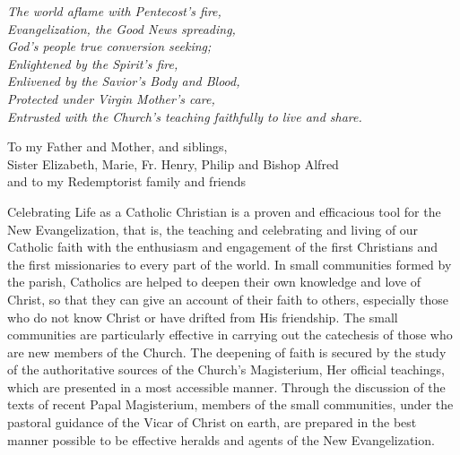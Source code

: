 \documentclass[oneside]{book}
\begin{document}

\vspace*{\fill}
\begin{center}

\emph{The world aflame with Pentecost's fire, \\
Evangelization, the Good News spreading, \\
God's people true conversion seeking; \\
Enlightened by the Spirit's fire, \\
Enlivened by the Savior's Body and Blood, \\
Protected under Virgin Mother's care, \\
Entrusted with the Church's teaching faithfully to live and share.}

\end{center}
\vspace*{\fill}
\pagebreak


\vspace*{\fill}
\begin{center}

To my Father and Mother, and siblings, \\
Sister Elizabeth, Marie, Fr. Henry, Philip and Bishop Alfred \\
and to my Redemptorist family and friends

\end{center}
\vspace*{\fill}
\pagebreak


\maketitle


Celebrating Life as a Catholic Christian is a proven and efficacious tool for
the New Evangelization, that is, the teaching and celebrating and living of our
Catholic faith with the enthusiasm and engagement of the first Christians and
the first missionaries to every part of the world.  In small communities formed
by the parish, Catholics are helped to deepen their own knowledge and love of
Christ, so that they can give an account of their faith to others, especially
those who do not know Christ or have drifted from His friendship.  The small
communities are particularly effective in carrying out the catechesis of those
who are new members of the Church.  The deepening of faith is secured by the
study of the authoritative sources of the Church's Magisterium, Her official
teachings, which are presented in a most accessible manner.  Through the
discussion of the texts of recent Papal Magisterium, members of the small
communities, under the pastoral guidance of the Vicar of Christ on earth, are
prepared in the best manner possible to be effective heralds and agents of the
New Evangelization.
\end{document}
